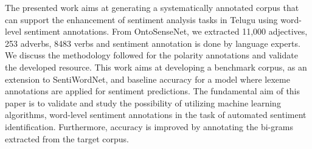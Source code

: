 The presented work aims at generating a systematically annotated corpus that can support the enhancement of sentiment analysis tasks in Telugu using word-level sentiment annotations. From OntoSenseNet, we extracted 11,000 adjectives, 253 adverbs, 8483 verbs and sentiment annotation is done by language experts. We discuss the methodology followed for the polarity annotations and validate the developed resource. This work aims at developing a benchmark corpus, as an extension to SentiWordNet, and baseline accuracy for a model where lexeme annotations are applied for sentiment predictions. The fundamental aim of this paper is to validate and study the possibility of utilizing machine learning algorithms, word-level sentiment annotations in the task of automated sentiment identification. Furthermore, accuracy is improved by annotating the bi-grams extracted from the target corpus.
